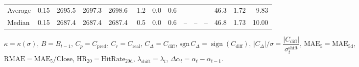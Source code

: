 \begin{threeparttable}
{\begin{tabular}{lrrrrrrrrrrrrr}
Average &     0.15 & 2695.5 & 2697.3 & 2698.6 &       -1.2 &                      0.0 &                 0.6 &         -- &        -- &             -- &             46.3 &            1.72 &                   9.83 \\
 Median &     0.15 & 2687.4 & 2687.4 & 2687.4 &        0.5 &                      0.0 &                 0.6 &         -- &        -- &             -- &             46.8 &            1.73 &                  10.00 \\
\bottomrule
\end{tabular}
}
\begin{tablenotes}\footnotesize
\item $\kappa=\kappa(\sigma)$, $B=B_{t-1}$, $C_p=C_{\text{pred}}$, $C_r=C_{\text{real}}$, $C_\Delta=C_{\text{diff}}$, $\mathrm{sgn}\,C_\Delta=\operatorname{sign}(C_{\text{diff}})$, $|C_\Delta|/\sigma=\dfrac{|C_{\text{diff}}|}{\sigma_t^{\text{shift}}}$, $\mathrm{MAE}_5=\mathrm{MAE}_{5\text{d}}$, $\mathrm{RMAE}= \mathrm{MAE}_5 / \text{Close}$, $\mathrm{HR}_{20}=\mathrm{HitRate}_{20\text{d}}$, 
$\lambda_{\text{shift}}=\lambda_t$, 
$\Delta\alpha_t=\alpha_t-\alpha_{t-1}$.
\end{tablenotes}
\end{threeparttable}
\endgroup

